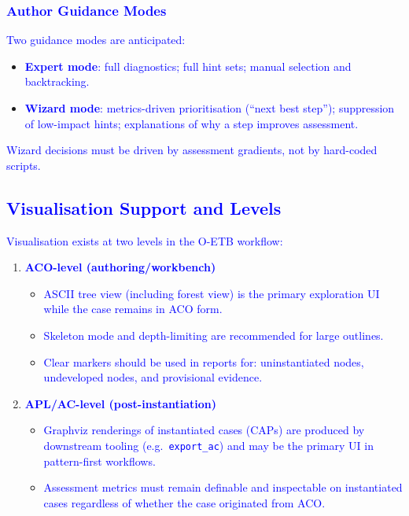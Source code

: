 \documentclass[11pt,twoside,a4paper]{article}
\begin{document}
\subsubsection{\textcolor{blue}{Author Guidance Modes}}

\textcolor{blue}{Two guidance modes are anticipated:}

\begin{itemize}[leftmargin=2em]
  \item \textcolor{blue}{\textbf{Expert mode}: full diagnostics; full hint sets; manual selection and backtracking.}
  \item \textcolor{blue}{\textbf{Wizard mode}: metrics-driven prioritisation (``next best step''); suppression of low-impact hints; explanations of why a step improves assessment.}
\end{itemize}

\textcolor{blue}{Wizard decisions must be driven by assessment gradients, not by hard-coded scripts.}

\subsection{\textcolor{blue}{Visualisation Support and Levels}}

\textcolor{blue}{Visualisation exists at two levels in the O-ETB workflow:}

\begin{enumerate}[leftmargin=2em]
  \item \textcolor{blue}{\textbf{ACO-level (authoring/workbench)}}
  \begin{itemize}[leftmargin=1.5em]
    \item \textcolor{blue}{ASCII tree view (including forest view) is the primary exploration UI while the case remains in ACO form.}
    \item \textcolor{blue}{Skeleton mode and depth-limiting are recommended for large outlines.}
    \item \textcolor{blue}{Clear markers should be used in reports for: uninstantiated nodes, undeveloped nodes, and provisional evidence.}
  \end{itemize}

  \item \textcolor{blue}{\textbf{APL/AC-level (post-instantiation)}}
  \begin{itemize}[leftmargin=1.5em]
    \item \textcolor{blue}{Graphviz renderings of instantiated cases (CAPs) are produced by downstream tooling (e.g.\ \texttt{export\_ac}) and may be the primary UI in pattern-first workflows.}
    \item \textcolor{blue}{Assessment metrics must remain definable and inspectable on instantiated cases regardless of whether the case originated from ACO.}
  \end{itemize}
\end{enumerate}
\end{document}

